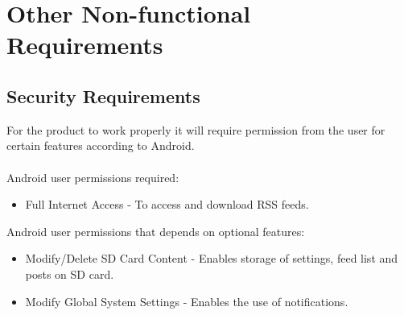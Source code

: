 \section{Other Non-functional Requirements}




\subsection{Security Requirements}
For the product to work properly it will require permission from the user for certain features according to Android\cite{android-perm}.\\ \\
Android user permissions required:
\begin{itemize}
  \item Full Internet Access - To access and download RSS feeds.
\end{itemize}
Android user permissions that depends on optional features:
\begin{itemize}
  \item Modify/Delete SD Card Content - Enables storage of settings, feed list and posts on SD card.
  \item Modify Global System Settings - Enables the use of notifications.
\end{itemize}


